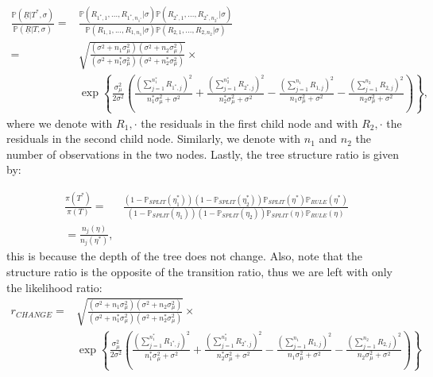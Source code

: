 \documentclass[11pt,a4paper]{article}
\newcommand{\vect}[1]{\underline{#1}}
\newcommand{\prob}{\mathbb{P}}
\begin{document}
\begin{equation}
    \label{eq:change_likelihood_ratio}
    \begin{split}
        \frac{\prob(\vect{R}|T^*, \sigma)}{\prob(\vect{R}|T, \sigma)} = & \frac{\prob(R_{1^*,1}, ... , R_{1^*,n_{1^*}} | \sigma)\prob(R_{2^*,1}, ... , R_{2^*,n_{2^*}} | \sigma)}{\prob(R_{1,1}, ... , R_{1,n_{1}} | \sigma)\prob(R_{2,1}, ... , R_{2,n_{2}} | \sigma)} \\
        =                                                               & \sqrt{\frac{(\sigma^2 + n_1 \sigma^2_\mu)(\sigma^2 + n_2 \sigma^2_\mu)}{(\sigma^2 + n_1^* \sigma^2_\mu)(\sigma^2 + n_2^* \sigma^2_\mu)}} \times                                               \\
                                                                        & \exp\left\{
        \frac{\sigma^2_\mu}{2\sigma^2}\left(\frac{(\sum_{j = 1}^{n_1^*} R_{1^*,j})^2}{n_1^*\sigma^2_\mu + \sigma^2} + \frac{(\sum_{j = 1}^{n_2^*} R_{2^*,j})^2}{n_2^*\sigma^2_\mu + \sigma^2} -
        \frac{(\sum_{j = 1}^{n_1} R_{1,j})^2}{n_1\sigma^2_\mu + \sigma^2}  - \frac{(\sum_{j = 1}^{n_2} R_{2,j})^2}{n_2\sigma^2_\mu + \sigma^2}
        \right) \right\},
    \end{split}
\end{equation}
where we denote with $R_1,\cdot$ the residuals in the first child node and with $R_2,\cdot$ the residuals in the second child node. Similarly, we denote with $n_1$ and $n_2$ the number of observations in the two nodes.
Lastly, the tree structure ratio is given by:

\begin{equation}
    \label{eq:change_struct_ratio}
    \begin{split}
        \frac{\pi(T^*)}{\pi(T)} = & \frac{(1 - \prob_{SPLIT}(\eta_1^*))(1 - \prob_{SPLIT}(\eta_2^*))\prob_{SPLIT}(\eta^*)\prob_{RULE}(\eta^*)}{(1 - \prob_{SPLIT}(\eta_1))(1 - \prob_{SPLIT}(\eta_2))\prob_{SPLIT}(\eta)\prob_{RULE}(\eta)} \\
        = \frac{n_j(\eta)}{n_j(\eta^*)},
    \end{split}
\end{equation}
this is because the depth of the tree does not change.
Also, note that the structure ratio is the opposite of the transition ratio, thus we are left with only the likelihood ratio:
\begin{equation}
    \label{eq:change_ratio}
    \begin{split}
        r_{CHANGE} = & \sqrt{\frac{(\sigma^2 + n_1 \sigma^2_\mu)(\sigma^2 + n_2 \sigma^2_\mu)}{(\sigma^2 + n_1^* \sigma^2_\mu)(\sigma^2 + n_2^* \sigma^2_\mu)}} \times \\
                     & \exp\left\{
        \frac{\sigma^2_\mu}{2\sigma^2}\left(\frac{(\sum_{j = 1}^{n_1^*} R_{1^*,j})^2}{n_1^*\sigma^2_\mu + \sigma^2} + \frac{(\sum_{j = 1}^{n_2^*} R_{2^*,j})^2}{n_2^*\sigma^2_\mu + \sigma^2} -
        \frac{(\sum_{j = 1}^{n_1} R_{1,j})^2}{n_1\sigma^2_\mu + \sigma^2}  - \frac{(\sum_{j = 1}^{n_2} R_{2,j})^2}{n_2\sigma^2_\mu + \sigma^2}
        \right) \right\}
    \end{split}
\end{equation}
\newpage
\end{document}
